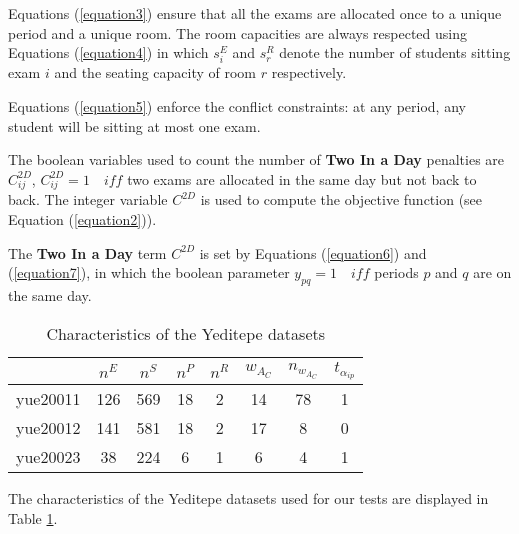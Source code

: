 \documentclass[a4paper,french,10pt]{report}
\begin{document}
Equations (\ref{equation3}) ensure that all the exams are allocated once to a unique period and a unique
room. The room capacities are always respected using Equations (\ref{equation4}) in which $s^E_i$
and $s^R_r$ denote the number of students sitting exam $i$ and the seating capacity of room $r$ respectively.\par
Equations (\ref{equation5}) enforce the conflict constraints: at any period, any student will be sitting
at most one exam.\par 
The boolean variables used to count the number of \textbf{Two In a Day} penalties are $C^{2D}_{ij}$,
$C^{2D}_{ij}=1\quad iff$ two exams are allocated in the same day but not back to back. The integer
variable $C^{2D}$ is used to compute the objective function (see Equation (\ref{equation2})).\par 
The \textbf{Two In a Day} term $C^{2D}$ is set by Equations (\ref{equation6}) and (\ref{equation7}), in which the boolean
parameter $y_{pq} = 1\quad iff$ periods $p$ and $q$ are on the same day.\par
\begin{table}[H]
 \centering
     \caption{Characteristics of the Yeditepe datasets}
     \begin{tabular}{c|cccc||cc||c}
      & $n^E$ & $n^S$ & $n^P$ & $n^R$ & $w_{A_C}$ & $n_{w_{A_C}}$ & $t_{\alpha_{ip}}$ \\
      \hline
     yue20011 & 126 & 569 & 18 & 2 & 14 & 78 & 1 \\
     yue20012 & 141 & 581 & 18 & 2 & 17 & 8 & 0 \\
     yue20023 & 38 & 224 & 6 & 1 & 6 & 4 & 1 \\
    \end{tabular}
    \label{table2}
\end{table}
The characteristics of the Yeditepe datasets used for our tests are displayed in Table \ref{table2}.\par


%
%


\end{document}
